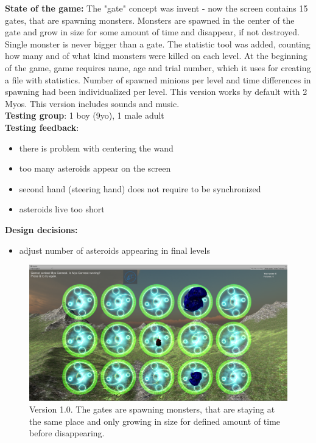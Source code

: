 \textbf{State of the game:} The "gate" concept was invent - now the screen contains 15 gates, that are spawning monsters. Monsters are spawned in the center of the gate and grow in size for some amount of time and disappear, if not destroyed. Single monster is never bigger than a gate. The statistic tool was added, counting how many and of what kind monsters were killed on each level. At the beginning of the game, game requires name, age and trial number, which it uses for creating a file with statistics. Number of spawned minions per level and time differences in spawning had been individualized per level. This version works by default with 2 Myos. This version includes sounds and music.
\\
\textbf{Testing group}: 1 boy (9yo), 1 male adult
\\
\textbf{Testing feedback}:
\begin{itemize}
\item there is problem with centering the wand
\item too many asteroids appear on the screen
\item second hand (steering hand) does not require to be synchronized
\item asteroids live too short
\end{itemize}


\textbf{Design decisions:}
\begin{itemize}
\item adjust number of asteroids appearing in final levels
\end{itemize}


\begin{figure}
\includegraphics[width=\textwidth]{graphics/screen_v3.png} 
\caption{Version 1.0. The gates are spawning monsters, that are staying at the same place and only growing in size for defined amount of time before disappearing.}
\end{figure}

